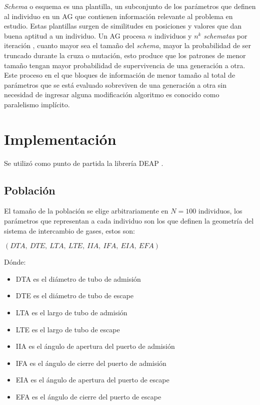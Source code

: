\emph{Schema} o esquema es una plantilla, un subconjunto de los parámetros que
definen al individuo en un AG que contienen información relevante al problema
en estudio.
%
Estas plantillas surgen de similitudes en posiciones y valores que dan buena
aptitud a un individuo.
%
Un AG procesa $n$ individuos y $n^k$ \emph{schematas} por iteración
\cite{goldberg}, cuanto mayor sea el tamaño del \emph{schema}, mayor la
probabilidad de ser truncado durante la cruza o mutación, esto produce que los
patrones de menor tamaño tengan mayor probabilidad de supervivencia de una
generación a otra.
%
Este proceso en el que bloques de información de menor tamaño al total de
parámetros que se está evaluado sobreviven de una generación a otra sin
necesidad de ingresar alguna modificación algoritmo es conocido como paralelismo
implícito.

\section{Implementación}
%
Se utilizó como punto de partida la librería DEAP \cite{DEAP_JMLR2012}.

\subsection{Población}
%
El tamaño de la población se elige arbitrariamente en $N=100$ individuos, los
parámetros que representan a cada individuo son los que definen la geometría
del sistema de intercambio de gases, estos son:

\centerline{$(DTA,\ DTE,\ LTA,\ LTE,\ IIA,\ IFA,\ EIA,\ EFA)$}
%
Dónde:
%
\begin{itemize}
    \item DTA es el diámetro de tubo de admisión
    \item DTE es el diámetro de tubo de escape
    \item LTA es el largo de tubo de admisión
    \item LTE es el largo de tubo de escape
    \item IIA es el ángulo de apertura del puerto de admisión
    \item IFA es el ángulo de cierre del puerto de admisión
    \item EIA es el ángulo de apertura del puerto de escape
    \item EFA es el ángulo de cierre del puerto de escape
\end{itemize}

